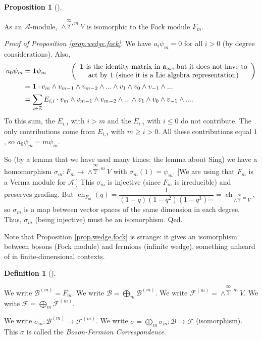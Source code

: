 \documentclass
[numbers=enddot,12pt,final,onecolumn,german,notitlepage]{scrartcl}%
\theoremstyle{definition}
\newtheorem{prop}[theo]{Proposition}
\newenvironment{proposition}[1][]
{\begin{prop}[#1]\begin{leftbar}}
{\end{leftbar}\end{prop}}
\newtheorem{defi}[theo]{Definition}
\newenvironment{definition}[1][]
{\begin{defi}[#1]\begin{leftbar}}
{\end{leftbar}\end{defi}}
\begin{document}
\begin{proposition}
\label{prop.wedge.fock}As an $\mathcal{A}$-module, $\wedge^{\dfrac{\infty}%
{2},m}V$ is isomorphic to the Fock module $F_{m}$.
\end{proposition}

\textit{Proof of Proposition \ref{prop.wedge.fock}.} We have $a_{i}\psi_{m}=0$
for all $i>0$ (by degree considerations). Also,%
\begin{align*}
a_{0}\psi_{m}  &  =\mathbf{1}\psi_{m}\ \ \ \ \ \ \ \ \ \ \left(
\begin{array}
[c]{c}%
\mathbf{1}\text{ is the identity matrix in }\mathfrak{a}_{\infty}\text{, but
it does not have to}\\
\text{act by }1\text{ (since it is a Lie algebra representation)}%
\end{array}
\right) \\
&  =\mathbf{1}\cdot v_{m}\wedge v_{m-1}\wedge v_{m-2}\wedge...\wedge
v_{1}\wedge v_{0}\wedge v_{-1}\wedge...\\
&  =\sum\limits_{i\in\mathbb{Z}}E_{i,i}\cdot v_{m}\wedge v_{m-1}\wedge
v_{m-2}\wedge...\wedge v_{1}\wedge v_{0}\wedge v_{-1}\wedge....
\end{align*}
To this sum, the $E_{i,i}$ with $i>m$ and the $E_{i,i}$ with $i\leq0$ do not
contribute. The only contributions come from $E_{i,i}$ with $m\geq i>0$. All
these contributions equal $1$, so $a_{0}\psi_{m}=m\psi_{m}$.

So (by a lemma that we have used many times: the lemma about Sing) we have a
homomorphism $\sigma_{m}:F_{m}\rightarrow\wedge^{\dfrac{\infty}{2},m}V$ with
$\sigma_{m}\left(  1\right)  =\psi_{m}$. [We are using that $F_{m}$ is a Verma
module for $\mathcal{A}$.] This $\sigma_{m}$ is injective (since $F_{m}$ is
irreducible) and preserves grading. But $\operatorname*{ch}\nolimits_{F_{m}%
}\left(  q\right)  =\dfrac{1}{\left(  1-q\right)  \left(  1-q^{2}\right)
\left(  1-q^{3}\right)  \cdots}=\operatorname*{ch}\nolimits_{\wedge
^{\dfrac{\infty}{2},m}V}$, so $\sigma_{m}$ is a map between vector spaces of
the same dimension in each degree. Thus, $\sigma_{m}$ (being injective) must
be an isomorphism. Qed.

Note that Proposition \ref{prop.wedge.fock} is strange: it gives an
isomorphism between bosons (Fock module) and fermions (infinite wedge),
something unheard of in finite-dimensional contexts.

\begin{definition}
We write $\mathcal{B}^{\left(  m\right)  }=F_{m}$. We write $\mathcal{B}%
=\bigoplus\limits_{m}\mathcal{B}^{\left(  m\right)  }$. We write
$\mathcal{F}^{\left(  m\right)  }=\wedge^{\dfrac{\infty}{2},m}V$. We write
$\mathcal{F}=\bigoplus\limits_{m}\mathcal{F}^{\left(  m\right)  }$.

We write $\sigma_{m}:\mathcal{B}^{\left(  m\right)  }\rightarrow
\mathcal{F}^{\left(  m\right)  }$. We write $\sigma=\bigoplus\limits_{m}%
\mathcal{\sigma}_{m}:\mathcal{B}\rightarrow\mathcal{F}$ (isomorphism). This
$\sigma$ is called the \textit{Boson-Fermion Correspondence}.
\end{definition}
\end{document}
